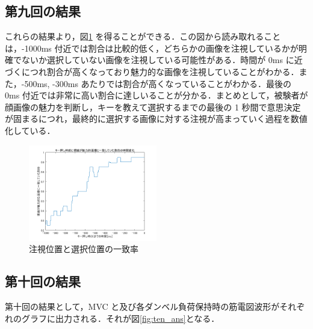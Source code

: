 \documentclass[dvipdfmx, titlepage, t]{jsarticle}
\begin{document}
    \subsection{第九回の結果}
    これらの結果より，図\ref{fig:exp3_9_plot} を得ることができる．この図から読み取れることは，-1000ms 付近では割合は比較的低く，どちらかの画像を注視しているかが明確でないか選択していない画像を注視している可能性がある．時間が 0ms に近づくにつれ割合が高くなっており魅力的な画像を注視していることがわかる．また，-500ms, -300ms あたりでは割合が高くなっていることがわかる．最後の 0ms 付近では非常に高い割合に達しいることが分かる．まとめとして，被験者が顔画像の魅力を判断し，キーを教えて選択するまでの最後の 1 秒間で意思決定が固まるにつれ，最終的に選択する画像に対する注視が高まっていく過程を数値化している．
    \begin{figure}[H]
        \centering
        \includegraphics[width=0.5\textwidth]{figure/g0310/lab3_2.png}
        \caption{注視位置と選択位置の一致率}
        \label{fig:exp3_9_plot}
    \end{figure}

    \subsection{第十回の結果}
    第十回の結果として，MVC と及び各ダンベル負荷保持時の筋電図波形がそれぞれのグラフに出力される．それが図\ref{fig:ten_ans}となる．
\end{document}
